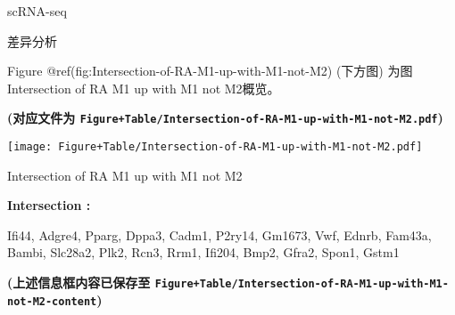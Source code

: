 \documentclass[
  ignorenonframetext,
]{beamer}
\begin{document}
\begin{frame}[fragile]{scRNA-seq}
\begin{block}{差异分析}
\begin{center}\vspace{1.5cm}\end{center}

Figure @ref(fig:Intersection-of-RA-M1-up-with-M1-not-M2) (下方图)
为图Intersection of RA M1 up with M1 not M2概览。

\textbf{(对应文件为
\texttt{Figure+Table/Intersection-of-RA-M1-up-with-M1-not-M2.pdf})}

\def\@captype{figure}
\begin{center}
\texttt{[image: Figure+Table/Intersection-of-RA-M1-up-with-M1-not-M2.pdf]}
\caption{Intersection of RA M1 up with M1 not M2}\label{fig:Intersection-of-RA-M1-up-with-M1-not-M2}
\end{center}

\begin{center}\vspace{1.5cm}\end{center}\begin{center}\begin{tcolorbox}[colback=gray!10, colframe=gray!50, width=0.9\linewidth, arc=1mm, boxrule=0.5pt]
\textbf{
Intersection
:}

\vspace{0.5em}

    Ifi44, Adgre4, Pparg, Dppa3, Cadm1, P2ry14, Gm1673,
Vwf, Ednrb, Fam43a, Bambi, Slc28a2, Plk2, Rcn3, Rrm1,
Ifi204, Bmp2, Gfra2, Spon1, Gstm1

\vspace{2em}
\end{tcolorbox}
\end{center}

\textbf{(上述信息框内容已保存至
\texttt{Figure+Table/Intersection-of-RA-M1-up-with-M1-not-M2-content})}
\end{block}
\end{frame}
\end{document}
